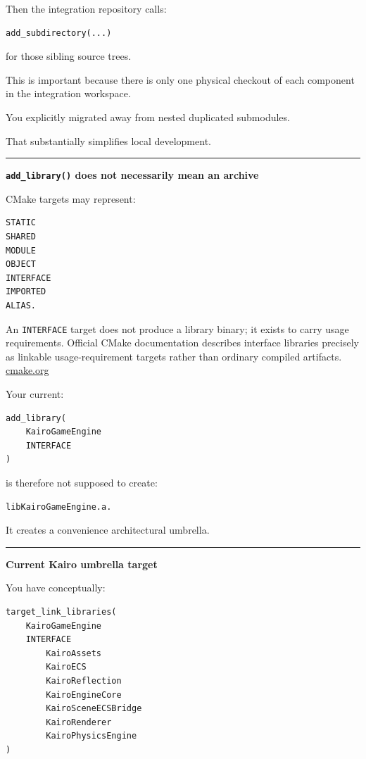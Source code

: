 Then the integration repository calls:

\begin{verbatim}
add_subdirectory(...)
\end{verbatim}

for those sibling source trees.

This is important because there is only one physical checkout of each component in the integration workspace.

You explicitly migrated away from nested duplicated submodules.

That substantially simplifies local development.

\begin{center}\rule{0.5\linewidth}{0.5pt}\end{center}

\textbf{\texttt{add\_library()} does not necessarily mean an archive}

CMake targets may represent:

\begin{verbatim}
STATIC
SHARED
MODULE
OBJECT
INTERFACE
IMPORTED
ALIAS.
\end{verbatim}

An \texttt{INTERFACE} target does not produce a library binary; it exists to carry usage requirements. Official CMake documentation describes interface libraries precisely as linkable usage-requirement targets rather than ordinary compiled artifacts. \href{https://cmake.org/cmake/help/latest/command/add_library.html?utm_source=chatgpt.com}{cmake.org}

Your current:

\begin{verbatim}
add_library(
    KairoGameEngine
    INTERFACE
)
\end{verbatim}

is therefore not supposed to create:

\begin{verbatim}
libKairoGameEngine.a.
\end{verbatim}

It creates a convenience architectural umbrella.

\begin{center}\rule{0.5\linewidth}{0.5pt}\end{center}

\textbf{Current Kairo umbrella target}

You have conceptually:

\begin{verbatim}
target_link_libraries(
    KairoGameEngine
    INTERFACE
        KairoAssets
        KairoECS
        KairoReflection
        KairoEngineCore
        KairoSceneECSBridge
        KairoRenderer
        KairoPhysicsEngine
)
\end{verbatim}

